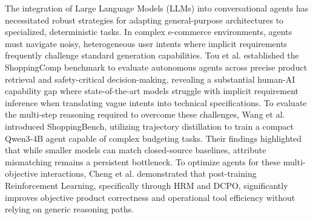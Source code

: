 \documentclass[journal,article,submit,pdftex,moreauthors]{Definitions/mdpi}
\begin{document}
The integration of Large Language Models (LLMs) into conversational agents has necessitated robust strategies for adapting general-purpose architectures to specialized, deterministic tasks. In complex e-commerce environments, agents must navigate noisy, heterogeneous user intents where implicit requirements frequently challenge standard generation capabilities. Tou et al. \cite{tou2025shoppingcomp} established the ShoppingComp benchmark to evaluate autonomous agents across precise product retrieval and safety-critical decision-making, revealing a substantial human-AI capability gap where state-of-the-art models struggle with implicit requirement inference when translating vague intents into technical specifications. To evaluate the multi-step reasoning required to overcome these challenges, Wang et al. \cite{wang2026shoppingbench} introduced ShoppingBench, utilizing trajectory distillation to train a compact Qwen3-4B agent capable of complex budgeting tasks. Their findings highlighted that while smaller models can match closed-source baselines, attribute mismatching remains a persistent bottleneck. To optimize agents for these multi-objective interactions, Cheng et al. \cite{cheng2026chatshopbuddy} demonstrated that post-training Reinforcement Learning, specifically through HRM and DCPO, significantly improves objective product correctness and operational tool efficiency without relying on generic reasoning paths.
\end{document}
